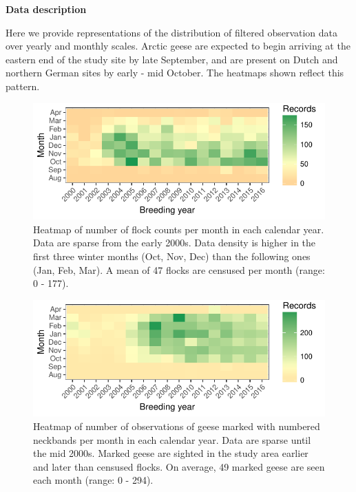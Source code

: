 \documentclass[10pt,twocolumn]{paper}
\begin{document}
\setcounter{figure}{0}

\textbf{Data description}

Here we provide representations of the distribution of filtered
observation data over yearly and monthly scales. Arctic geese are
expected to begin arriving at the eastern end of the study site by late
September, and are present on Dutch and northern German sites by early -
mid October. The heatmaps shown reflect this pattern.

\begin{figure}[H]
\includegraphics[width = 1.5\linewidth]{data_density.pdf}
\caption{{\small Heatmap of number of flock counts per month in each calendar year. Data are sparse from the early 2000s. Data density is higher in the first three winter months (Oct, Nov, Dec) than the following ones (Jan, Feb, Mar). A mean of 47 flocks are censused per month (range: 0 - 177).}}
\end{figure}

\begin{figure}[H]
\includegraphics[width = 1.5\linewidth]{data_density_gorg.pdf}
\caption{{\small Heatmap of number of observations of geese marked with numbered neckbands per month in each calendar year. Data are sparse until the mid 2000s. Marked geese are sighted in the study area earlier and later than censused flocks. On average, 49 marked geese are seen each month (range: 0 - 294).}}
\end{figure}
\end{document}
